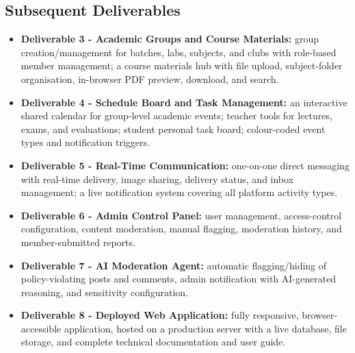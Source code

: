 \documentclass[11pt,a4paper]{article}
\begin{document}
\subsection{Subsequent Deliverables}
\begin{itemize}[leftmargin=0.7cm]
    \item \textbf{Deliverable 3 - Academic Groups and Course Materials:} group creation/management for batches, labs, subjects, and clubs with role-based member management; a course materials hub with file upload, subject-folder organisation, in-browser PDF preview, download, and search.
    \item \textbf{Deliverable 4 - Schedule Board and Task Management:} an interactive shared calendar for group-level academic events; teacher tools for lectures, exams, and evaluations; student personal task board; colour-coded event types and notification triggers.
    \item \textbf{Deliverable 5 - Real-Time Communication:} one-on-one direct messaging with real-time delivery, image sharing, delivery status, and inbox management; a live notification system covering all platform activity types.
    \item \textbf{Deliverable 6 - Admin Control Panel:} user management, access-control configuration, content moderation, manual flagging, moderation history, and member-submitted reports.
    \item \textbf{Deliverable 7 - AI Moderation Agent:} automatic flagging/hiding of policy-violating posts and comments, admin notification with AI-generated reasoning, and sensitivity configuration.
    \item \textbf{Deliverable 8 - Deployed Web Application:} fully responsive, browser-accessible application, hosted on a production server with a live database, file storage, and complete technical documentation and user guide.
\end{itemize}
\end{document}
